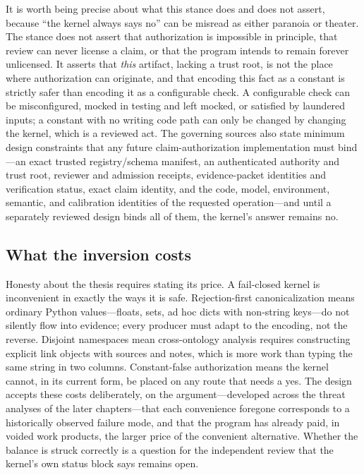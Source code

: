 It is worth being precise about what this stance does and does not
assert, because ``the kernel always says no'' can be misread as either
paranoia or theater. The stance does not assert that authorization is
impossible in principle, that review can never license a claim, or that
the program intends to remain forever unlicensed. It asserts that
\emph{this} artifact, lacking a trust root, is not the place where
authorization can originate, and that encoding this fact as a constant is
strictly safer than encoding it as a configurable check. A configurable
check can be misconfigured, mocked in testing and left mocked, or
satisfied by laundered inputs; a constant with no writing code path can
only be changed by changing the kernel, which is a reviewed act. The
governing sources also state minimum design constraints that any future
claim-authorization implementation must bind---an exact trusted
registry/schema manifest, an authenticated authority and trust root,
reviewer and admission receipts, evidence-packet identities and
verification status, exact claim identity, and the code, model,
environment, semantic, and calibration identities of the requested
operation---and until a separately reviewed design binds all of them,
the kernel's answer remains no.

\subsection{What the inversion costs}\label{ch01:costs}

Honesty about the thesis requires stating its price. A fail-closed kernel
is inconvenient in exactly the ways it is safe. Rejection-first
canonicalization means ordinary Python values---floats, sets, ad hoc
dicts with non-string keys---do not silently flow into evidence; every
producer must adapt to the encoding, not the reverse. Disjoint
namespaces mean cross-ontology analysis requires constructing explicit
link objects with sources and notes, which is more work than typing the
same string in two columns. Constant-false authorization means the kernel
cannot, in its current form, be placed on any route that needs a yes.
The design accepts these costs deliberately, on the argument---developed
across the threat analyses of the later chapters---that each convenience
foregone corresponds to a historically observed failure mode, and that
the program has already paid, in voided work products, the larger price
of the convenient alternative. Whether the balance is struck correctly
is a question for the independent review that the kernel's own status
block says remains open.

